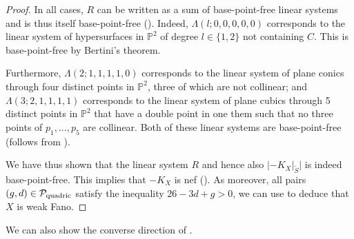 \documentclass[english,11pt,reqno]{amsart}
\newcommand{\Ptwo}{\mathbb{P}^2}
\begin{document}
\begin{proof}
In all cases, $R$ can be written as a sum of base-point-free linear systems and is thus itself base-point-free (). Indeed, $\Lambda(l;0,0,0,0,0)$ corresponds to the linear system of hypersurfaces in $\Ptwo$ of degree $l\in\{1,2\}$ not containing $C$. This is base-point-free by Bertini's theorem. \par
Furthermore, $\Lambda(2;1,1,1,1,0)$ corresponds to the linear system of plane conics through four distinct points in $\Ptwo$, three of which are not collinear; and $\Lambda(3;2,1,1,1,1)$ corresponds to the linear system of plane cubics through 5 distinct points in $\Ptwo$ that have a double point in one them such that no three points of $p_1,\dots, p_5$ are collinear. Both of these linear systems are base-point-free (follows from \cite[Prop.\ V.4.1 + V.4.3]{Hartshorne}).\par 
We have thus shown that the linear system $R$ and hence also $|-K_X|_{\widetilde{S}}|$ is indeed base-point-free. This implies that $-K_X$ is nef (). As moreover, all pairs $(g,d)\in\mathcal{P}_{\textup{quadric}}$ satisfy the inequality $26-3d+g > 0$, we can use  to deduce that $X$ is weak Fano.
\end{proof}
%
%
%
%
We can also show the converse direction of .
%
\end{document}

